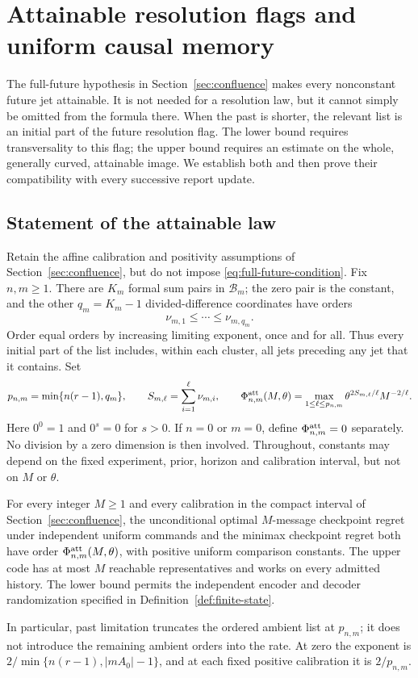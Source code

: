 \section{Attainable resolution flags and uniform causal memory}\label{sec:attainable-flag}
The full-future hypothesis in Section~\ref{sec:confluence} makes every
nonconstant future jet attainable. It is not needed for a resolution law,
but it cannot simply be omitted from the formula there. When the past is
shorter, the relevant list is an initial part of the future resolution
flag. The lower bound requires transversality to this flag; the upper
bound requires an estimate on the whole, generally curved, attainable
image. We establish both and then prove their compatibility with every
successive report update.

\subsection{Statement of the attainable law}
Retain the affine calibration and positivity assumptions of
Section~\ref{sec:confluence}, but do not impose
\eqref{eq:full-future-condition}. Fix $n,m\ge1$. There are $K_m$ formal
sum pairs in $\mathcal B_m$; the zero pair is the constant, and the other
$q_m=K_m-1$ divided-difference coordinates have orders
\[
 \nu_{m,1}\le\cdots\le\nu_{m,q_m}.
\]
Order equal orders by increasing limiting exponent, once and for all.
Thus every initial part of the list includes, within each cluster, all
jets preceding any jet that it contains. Set
\begin{equation}\label{eq:attainable-orders}
 p_{n,m}=\min\{n(r-1),q_m\},\qquad
 S_{m,\ell}=\sum_{i=1}^{\ell}\nu_{m,i},\qquad
 \Phi^{\rm att}_{n,m}(M,\theta)
 =\max_{1\le\ell\le p_{n,m}}
       \theta^{2S_{m,\ell}/\ell}M^{-2/\ell}.
\end{equation}
Here $0^0=1$ and $0^s=0$ for $s>0$. If $n=0$ or $m=0$, define
$\Phi^{\rm att}_{n,m}=0$ separately. No division by a zero dimension is
then involved. Throughout, constants may depend on the fixed experiment,
prior, horizon and calibration interval, but not on $M$ or $\theta$.

\begin{theorem}\label{thm:attainable-checkpoint}
For every integer $M\ge1$ and every calibration in the compact interval
of Section~\ref{sec:confluence}, the unconditional optimal $M$-message
checkpoint regret under independent uniform commands and the minimax
checkpoint regret both have order
$\Phi^{\rm att}_{n,m}(M,\theta)$, with positive uniform comparison
constants. The upper code has at most $M$ reachable representatives
and works on every admitted history. The lower bound permits the
independent encoder and decoder randomization specified in
Definition~\ref{def:finite-state}.

In particular, past limitation truncates the ordered ambient list at
$p_{n,m}$; it does not introduce the remaining ambient orders into the
rate. At zero the exponent is
$2/\min\{n(r-1),|mA_0|-1\}$, and at each fixed positive calibration it
is $2/p_{n,m}$.
\end{theorem}


